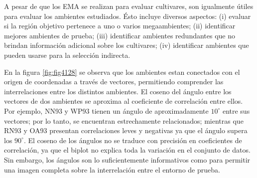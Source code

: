 

A pesar de que los EMA se realizan para evaluar cultivares, son igualmente útiles para evaluar los ambientes estudiados. Ésto incluye diversos aspectos: (i) evaluar si la región objetivo pertenece a uno o varios megaambientes; (ii) identificar mejores ambientes de prueba; (iii) identificar ambientes redundantes que no brindan información adicional sobre los cultivares; (iv) identificar ambientes que pueden usarse para la selección indirecta.

En la figura \ref{fig:fig4128} se observa que los ambientes estan conectados con el origen de coordenadas a través de vectores, permitiendo comprender las interrelaciones entre los distintos ambientes. El coseno del ángulo entre los vectores de dos ambientes se aproxima al coeficiente de correlación entre ellos. Por ejemplo, NN93 y WP93 tienen un ángulo de aproximadamente $10^{\circ}$ entre sus vectores; por lo tanto, se encuentran estrechamente relacionados; mientras que RN93 y OA93 presentan correlaciones leves y negativas ya que el ángulo supera los $90^{\circ}$. El coseno de los ángulos no se traduce con precisión en coeficientes de correlación, ya que el biplot no explica toda la variación en el conjunto de datos. Sin embargo, los ángulos son lo suficientemente informativos como para permitir una imagen completa sobre la interrelación entre el entorno de prueba.

